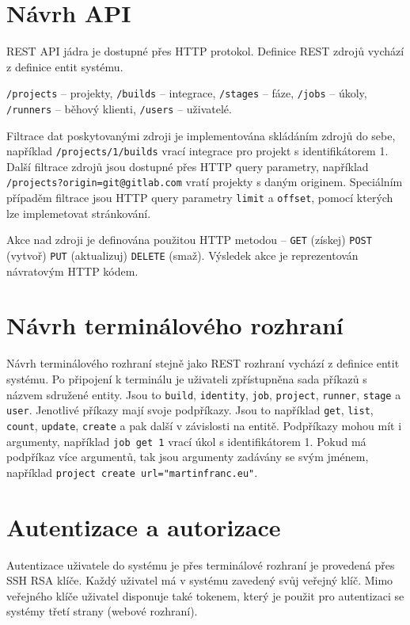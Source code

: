 \section{Návrh API}

REST API jádra je dostupné přes HTTP protokol.
Definice REST zdrojů vychází z definice entit systému.

\verb|/projects| -- projekty,
\verb|/builds| -- integrace,
\verb|/stages| -- fáze,
\verb|/jobs| -- úkoly,
\verb|/runners| -- běhový klienti,
\verb|/users| -- uživatelé.

Filtrace dat poskytovanými zdroji je implementována skládáním zdrojů do sebe, například \verb|/projects/1/builds| vrací integrace pro projekt s identifikátorem 1.
Další filtrace zdrojů jsou dostupné přes HTTP query parametry, například \verb|/projects?origin=git@gitlab.com| vratí projekty s daným originem.
Speciálním případěm filtrace jsou HTTP query parametry \verb|limit| a \verb|offset|, pomocí kterých lze implemetovat stránkování.

Akce nad zdroji je definována použitou HTTP metodou -- \verb|GET| (získej) \verb|POST| (vytvoř) \verb|PUT| (aktualizuj) \verb|DELETE| (smaž).
Výsledek akce je reprezentován návratovým HTTP kódem.

\section{Návrh terminálového rozhraní}

Návrh terminálového rozhraní stejně jako REST rozhraní vychází z definice entit systému.
Po připojení k terminálu je uživateli zpřístupněna sada příkazů s názvem sdružené entity.
Jsou to \verb|build|, \verb|identity|, \verb|job|, \verb|project|, \verb|runner|, \verb|stage| a \verb|user|.
Jenotlivé příkazy mají svoje podpříkazy.
Jsou to například \verb|get|, \verb|list|, \verb|count|, \verb|update|, \verb|create| a pak další v závislosti na entitě.
Podpříkazy mohou mít i argumenty, například \verb|job get 1| vrací úkol s identifikátorem 1.
Pokud má podpříkaz více argumentů, tak jsou argumenty zadávány se svým jménem, například \verb|project create url="martinfranc.eu"|.

\section{Autentizace a autorizace}

Autentizace uživatele do systému je přes terminálové rozhraní je provedená přes SSH RSA klíče.
Každý uživatel má v systému zavedený svůj veřejný klíč.
Mimo veřejného klíče uživatel disponuje také tokenem, který je použit pro autentizaci se systémy třetí strany (webové rozhraní).

